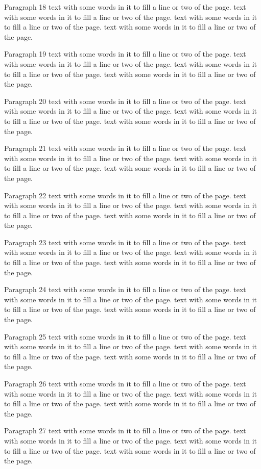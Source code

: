 \documentclass{article}
\begin{document}
Paragraph 18 text with some words in it to fill a line or two of the page. text with some words in it to fill a line or two of the page. text with some words in it to fill a line or two of the page. text with some words in it to fill a line or two of the page. 

Paragraph 19 text with some words in it to fill a line or two of the page. text with some words in it to fill a line or two of the page. text with some words in it to fill a line or two of the page. text with some words in it to fill a line or two of the page. 

Paragraph 20 text with some words in it to fill a line or two of the page. text with some words in it to fill a line or two of the page. text with some words in it to fill a line or two of the page. text with some words in it to fill a line or two of the page. 

Paragraph 21 text with some words in it to fill a line or two of the page. text with some words in it to fill a line or two of the page. text with some words in it to fill a line or two of the page. text with some words in it to fill a line or two of the page. 

Paragraph 22 text with some words in it to fill a line or two of the page. text with some words in it to fill a line or two of the page. text with some words in it to fill a line or two of the page. text with some words in it to fill a line or two of the page. 

Paragraph 23 text with some words in it to fill a line or two of the page. text with some words in it to fill a line or two of the page. text with some words in it to fill a line or two of the page. text with some words in it to fill a line or two of the page. 

Paragraph 24 text with some words in it to fill a line or two of the page. text with some words in it to fill a line or two of the page. text with some words in it to fill a line or two of the page. text with some words in it to fill a line or two of the page. 

Paragraph 25 text with some words in it to fill a line or two of the page. text with some words in it to fill a line or two of the page. text with some words in it to fill a line or two of the page. text with some words in it to fill a line or two of the page. 

Paragraph 26 text with some words in it to fill a line or two of the page. text with some words in it to fill a line or two of the page. text with some words in it to fill a line or two of the page. text with some words in it to fill a line or two of the page. 

Paragraph 27 text with some words in it to fill a line or two of the page. text with some words in it to fill a line or two of the page. text with some words in it to fill a line or two of the page. text with some words in it to fill a line or two of the page. 
\end{document}
